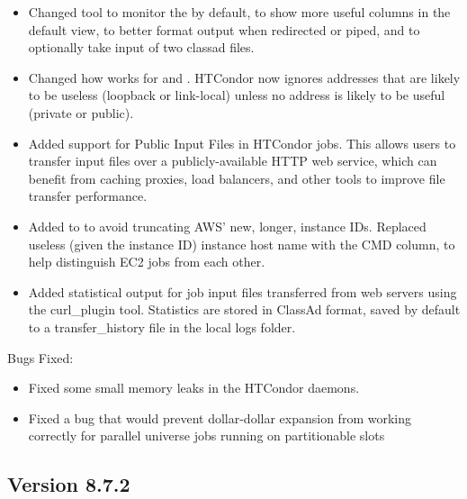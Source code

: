 \begin{itemize}

\item Changed  tool 
to monitor the  by default, 
to show more useful columns in the default view,
to better format output when redirected or piped, and
to optionally take input of two classad files.

\item Changed how  works for  and
.  HTCondor now ignores addresses that are likely
to be useless (loopback or link-local) unless no address is likely to be
useful (private or public).

\item Added support for Public Input Files in HTCondor jobs. This allows
users to transfer input files over a publicly-available HTTP web service,
which can benefit from caching proxies, load balancers, and other tools
to improve file transfer performance.

\item Added  to  to avoid truncating AWS' new,
longer, instance IDs.  Replaced useless (given the instance ID) instance
host name with the CMD column, to help distinguish EC2 jobs from each other.

\item Added statistical output for job input files transferred from web servers
using the curl\_plugin tool. Statistics are stored in ClassAd format, saved by
default to a transfer\_history file in the local logs folder.

\end{itemize}

\noindent Bugs Fixed:

\begin{itemize}

\item Fixed some small memory leaks in the HTCondor daemons.

\item Fixed a bug that would prevent dollar-dollar expansion from 
working correctly for parallel universe jobs running on partitionable 
slots 

\end{itemize}

\subsection*{\label{sec:New-8-7-2}Version 8.7.2}

